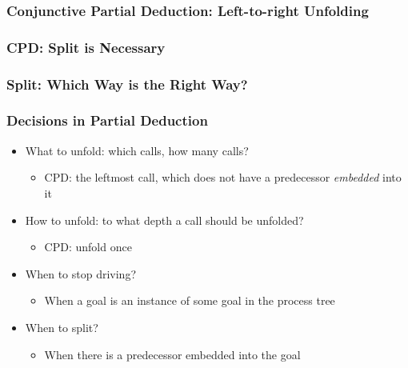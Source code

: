 \documentclass[xcolor=table]{beamer}
\begin{document}
\begin{frame}[fragile]
  \frametitle{Conjunctive Partial Deduction: Left-to-right Unfolding}

\begin{center}
  
\end{center}
\end{frame}


\begin{frame}[fragile]
  \frametitle{CPD: Split is Necessary}
\begin{center}
  
\end{center}
\end{frame}

\begin{frame}[fragile]
  \frametitle{Split: Which Way is the Right Way?}

\end{frame}

\begin{frame}[fragile]
  \frametitle{Decisions in Partial Deduction}
\begin{itemize}
  \item What to unfold: which calls, how many calls?
  \begin{itemize}
    \item CPD: the leftmost call, which does not have a predecessor \emph{embedded} into it
  \end{itemize}
  \item How to unfold: to what depth a call should be unfolded?
  \begin{itemize}
    \item CPD: unfold once
  \end{itemize}
  \item When to stop driving?
  \begin{itemize}
    \item When a goal is an instance of some goal in the process tree
  \end{itemize}
  \item When to split?
  \begin{itemize}
    \item When there is a predecessor embedded into the goal
  \end{itemize}
\end{itemize}
\end{frame}
\end{document}
